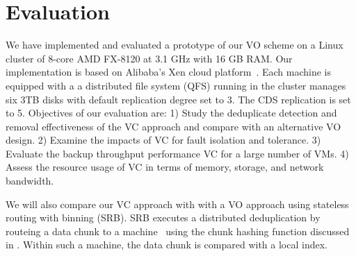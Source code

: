 
\section{Evaluation}
\label{sect:exper}

We have implemented and evaluated a prototype of our VO scheme on a Linux cluster
of 8-core AMD FX-8120 at 3.1 GHz with 16 GB RAM. 
Our implementation is based on Alibaba's Xen cloud platform~\cite{Aliyun,WeiZhangIEEE}.
Each machine  is equipped with a 
a distributed file system (QFS) running in the cluster manages six 3TB disks
with default replication degree set to 3. The CDS replication is set to 5.
Objectives of our evaluation are:
1) Study the deduplicate detection and removal effectiveness of the VC approach and compare with an alternative VO
design.
2) Examine the impacts of VC for fault isolation and tolerance. 
3) Evaluate the backup throughput performance VC  for a large number of VMs.
4) Assess the resource usage  of VC in terms of memory, storage, and network bandwidth.


We will also compare our VC approach with  with
a VO approach  using stateless routing with binning (SRB).
SRB executes a distributed deduplication by routeing a data chunk to a machine~\cite{ParallelDataDomain}
using  the chunk hashing function discussed in \cite{??}. Within such a machine, the data chunk is compared with
a local index. 

